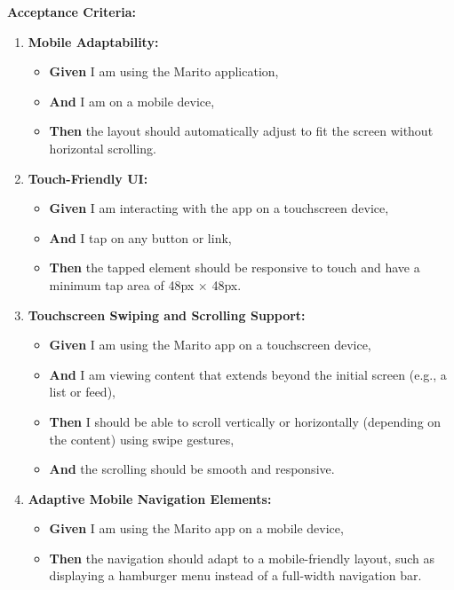 \documentclass[12pt]{article}
\begin{document}
\vspace{1em}
\textbf{Acceptance Criteria:}
\begin{enumerate}
    \item \textbf{Mobile Adaptability:}
    \begin{itemize}
        \item \textbf{Given} I am using the Marito application,
        \item \textbf{And} I am on a mobile device,
        \item \textbf{Then} the layout should automatically adjust to fit the screen without horizontal scrolling.
    \end{itemize}

    \item \textbf{Touch-Friendly UI:}
    \begin{itemize}
        \item \textbf{Given} I am interacting with the app on a touchscreen device,
        \item \textbf{And} I tap on any button or link,
        \item \textbf{Then} the tapped element should be responsive to touch and have a minimum tap area of 48px × 48px.
    \end{itemize}

    \item \textbf{Touchscreen Swiping and Scrolling Support:}
    \begin{itemize}
        \item \textbf{Given} I am using the Marito app on a touchscreen device,
        \item \textbf{And} I am viewing content that extends beyond the initial screen (e.g., a list or feed),
        \item \textbf{Then} I should be able to scroll vertically or horizontally (depending on the content) using swipe gestures,
        \item \textbf{And} the scrolling should be smooth and responsive.
    \end{itemize}

    \item \textbf{Adaptive Mobile Navigation Elements:}
    \begin{itemize}
        \item \textbf{Given} I am using the Marito app on a mobile device,
        \item \textbf{Then} the navigation should adapt to a mobile-friendly layout, such as displaying a hamburger menu instead of a full-width navigation bar.
    \end{itemize}


\end{enumerate}
\end{document}
